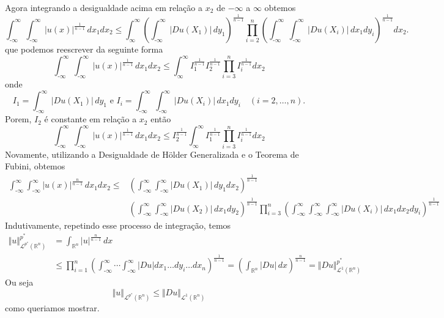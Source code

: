 \documentclass[a4paper, 11pt]{book}
\theoremstyle{definition}
\newcommand{\m}{\text{-}}
\newcommand{\bR}{\mathbb{R}}
\newcommand{\cL}{\mathcal{L}}
\begin{document}
\begin{prf}
\[    \]
    Agora integrando a desigualdade acima em relação a $x_2$ de $-\infty$ a $\infty$ obtemos
    \[
        \int_{\m\infty}^{\infty}\int_{\m\infty}^{\infty} |u(x)|^{\frac{1}{n-1}} \,dx_1dx_2 \leqslant \int_{\infty}^{\infty}\!\!\left( \int_{\m\infty}^{\infty} |Du(X_1)| \,dy_1 \right)^{\frac{1}{n-1}}\prod_{i=2}^n \left(\int_{\m\infty}^{\infty} \!\int_{\m\infty}^{\infty} |Du(X_i)| \, dx_1dy_i\right)^{\frac{1}{n-1}} \!dx_2.
    \]
    que podemos reescrever da seguinte forma
    \[
        \int_{\m\infty}^{\infty}\int_{\m\infty}^{\infty} |u(x)|^{\frac{1}{n-1}} \,dx_1dx_2 \leqslant \int_{\infty}^{\infty} I_1^{\frac{1}{n-1}}I_2^{\frac{1}{n-1}}\prod_{i=3}^n I_i^{\frac{1}{n-1}} \!dx_2
    \]
    onde
    \[
        I_1 = \int_{\m\infty}^{\infty} |Du(X_1)| \,dy_1 \text{ e } I_i = \int_{\m\infty}^{\infty} \!\int_{\m\infty}^{\infty} |Du(X_i)| \, dx_1dy_i \quad(i = 2,\dots,n).
    \]
    Porem, $I_2$ é constante em relação a $x_2$ então
    \[
        \int_{\m\infty}^{\infty}\int_{\m\infty}^{\infty} |u(x)|^{\frac{1}{n-1}} \,dx_1dx_2 \leqslant I_2^{\frac{1}{n-1}}\int_{\infty}^{\infty} I_1^{\frac{1}{n-1}}\prod_{i=3}^n I_i^{\frac{1}{n-1}} \!dx_2
    \]
    Novamente, utilizando a Desigualdade de Hölder Generalizada e o Teorema de Fubini, obtemos
    \small{
    \[
        \begin{aligned}
            \int_{\m\infty}^{\infty}\int_{\m\infty}^{\infty} |u(x)|^{\frac{n}{n-1}} \,dx_1dx_2 \leqslant &\left( \int_{\m\infty}^{\infty} \int_{\m\infty}^{\infty} |Du(X_1)| \,dy_1 dx_2 \right)^{\frac{1}{n-1}}\\ &\left( \int_{\m\infty}^{\infty} \int_{\m\infty}^{\infty} |Du(X_2)| \,dx_1 dy_2 \right)^{\frac{1}{n-1}} \prod_{i=3}^n \left( \int_{\m\infty}^{\infty}\int_{\m\infty}^{\infty}\int_{\m\infty}^{\infty} |Du(X_i)| \,dx_1dx_2dy_i \right)^{\frac{1}{n-1}} 
        \end{aligned}
    \]\!}
    Indutivamente, repetindo esse processo de integração, temos
    \[
        \begin{aligned}
            \Vert u \Vert_{\cL^{p^*}(\bR^n)}^{p^*} &= \int_{\bR^n} |u|^{\frac{n}{n-1}} \, dx \\
            &\leqslant \prod_{i=1}^n \left( \int_{\m\infty}^{\infty} \cdots \int_{\m\infty}^\infty |Du| dx_1\dots dy_i \dots dx_n \right)^{\frac{1}{n-1}}
            = \left(\int_{\bR^n} |Du|\,dx\right)^{\frac{n}{n-1}} = \Vert Du \Vert_{\cL^1(\bR^n)}^{p^*}
        \end{aligned}
    \]
    Ou seja
    \begin{equation} \label{eq:desigualdadegnss}
        \Vert u \Vert_{\cL^{p^*}(\bR^n)} \leqslant\Vert Du \Vert_{\cL^1(\bR^n)}
    \end{equation}
    como queriamos mostrar.


\end{prf}
\end{document}

